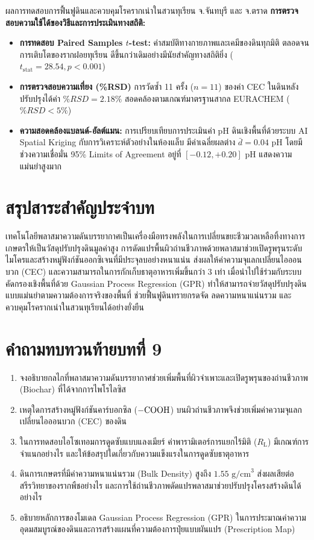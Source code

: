 \begin{agribox}{ผลการทดสอบการฟื้นฟูดินและควบคุมโรครากเน่าในสวนทุเรียน จ.จันทบุรี และ จ.ตราด}
\textbf{การตรวจสอบความใช้ได้ของวิธีและการประเมินทางสถิติ:}
\begin{itemize}
    \item \textbf{การทดสอบ Paired Samples $t$-test:} ค่าสมบัติทางกายภาพและเคมีของดินทุกมิติ ตลอดจนการเติบโตของรากฝอยทุเรียน ดีขึ้นกว่าเดิมอย่างมีนัยสำคัญทางสถิติยิ่ง ($t_{\text{stat}} = 28.54, p < 0.001$)
    \item \textbf{การตรวจสอบความเที่ยง (\%RSD)} การวัดซ้ำ 11 ครั้ง ($n = 11$) ของค่า CEC ในดินหลังปรับปรุงได้ค่า $\%RSD = 2.18\%$ สอดคล้องตามเกณฑ์มาตรฐานสากล EURACHEM ($\%RSD < 5\%$)
    \item \textbf{ความสอดคล้องแบลนด์-อัลต์แมน:} การเปรียบเทียบการประเมินค่า pH ดินเชิงพื้นที่ด้วยระบบ AI Spatial Kriging กับการวิเคราะห์ตัวอย่างในห้องแล็บ มีค่าเฉลี่ยผลต่าง $\bar{d} = 0.04 \text{ pH}$ โดยมีช่วงความเชื่อมั่น 95\% Limits of Agreement อยู่ที่ $[-0.12, +0.20] \text{ pH}$ แสดงความแม่นยำสูงมาก
\end{itemize}
\end{agribox}

\section{สรุปสาระสำคัญประจำบท}

เทคโนโลยีพลาสมาความดันบรรยากาศเป็นเครื่องมือทรงพลังในการเปลี่ยนขยะชีวมวลเหลือทิ้งทางการเกษตรให้เป็นวัสดุปรับปรุงดินมูลค่าสูง การดัดแปรพื้นผิวถ่านชีวภาพด้วยพลาสมาช่วยเปิดรูพรุนระดับไมโครและสร้างหมู่ฟังก์ชันออกซิเจนที่มีประจุลบอย่างหนาแน่น ส่งผลให้ค่าความจุแลกเปลี่ยนไอออนบวก (CEC) และความสามารถในการกักเก็บธาตุอาหารเพิ่มขึ้นกว่า 3 เท่า เมื่อนำไปใช้ร่วมกับระบบคัดกรองเชิงพื้นที่ด้วย Gaussian Process Regression (GPR) ทำให้สามารถจ่ายวัสดุปรับปรุงดินแบบแม่นยำตามความต้องการจริงของพื้นที่ ช่วยฟื้นฟูดินทรายกรดจัด ลดความหนาแน่นรวม และควบคุมโรครากเน่าในสวนทุเรียนได้อย่างยั่งยืน

\section{คำถามทบทวนท้ายบทที่ 9}

\begin{enumerate}
    \item จงอธิบายกลไกที่พลาสมาความดันบรรยากาศช่วยเพิ่มพื้นที่ผิวจำเพาะและเปิดรูพรุนของถ่านชีวภาพ (Biochar) ที่ได้จากการไพโรไลซิส
    \item เหตุใดการสร้างหมู่ฟังก์ชันคาร์บอกซิล ($-\ce{COOH}$) บนผิวถ่านชีวภาพจึงช่วยเพิ่มค่าความจุแลกเปลี่ยนไอออนบวก (CEC) ของดิน
    \item ในการทดสอบไอโซเทอมการดูดซับแบบแลงเมียร์ ค่าพารามิเตอร์การแยกไร้มิติ ($R_{\text{L}}$) มีเกณฑ์การจำแนกอย่างไร และให้ข้อสรุปใดเกี่ยวกับความแข็งแรงในการดูดซับธาตุอาหาร
    \item ดินการเกษตรที่มีค่าความหนาแน่นรวม (Bulk Density) สูงถึง $1.55 \text{ g/cm}^3$ ส่งผลเสียต่อสรีรวิทยาของรากพืชอย่างไร และการใช้ถ่านชีวภาพดัดแปรพลาสมาช่วยปรับปรุงโครงสร้างดินได้อย่างไร
    \item อธิบายหลักการของโมเดล Gaussian Process Regression (GPR) ในการประมาณค่าความอุดมสมบูรณ์ของดินและการสร้างแผนที่ความต้องการปุ๋ยแบบผันแปร (Prescription Map)
\end{enumerate}
